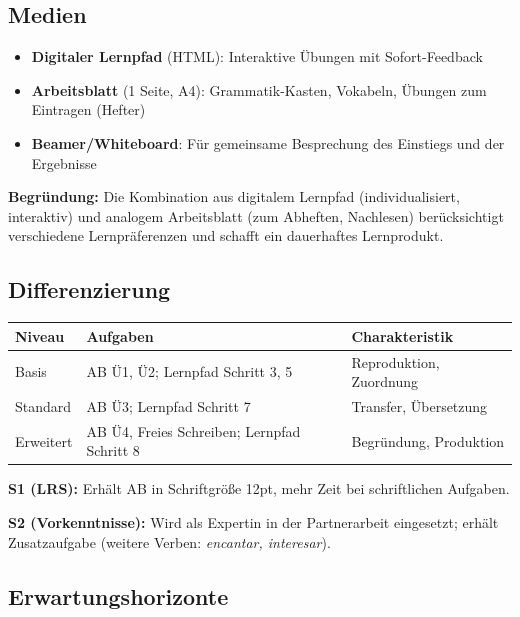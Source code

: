 \documentclass[11pt, a4paper]{article}
\newcommand{\es}[1]{\textcolor{spanisch}{\textit{#1}}}
\begin{document}
\subsection{Medien}

\begin{itemize}[leftmargin=2em]
    \item \textbf{Digitaler Lernpfad} (HTML): Interaktive Übungen mit Sofort-Feedback
    \item \textbf{Arbeitsblatt} (1 Seite, A4): Grammatik-Kasten, Vokabeln, Übungen zum Eintragen (Hefter)
    \item \textbf{Beamer/Whiteboard}: Für gemeinsame Besprechung des Einstiegs und der Ergebnisse
\end{itemize}

\textbf{Begründung:} Die Kombination aus digitalem Lernpfad (individualisiert, interaktiv) und analogem Arbeitsblatt (zum Abheften, Nachlesen) berücksichtigt verschiedene Lernpräferenzen und schafft ein dauerhaftes Lernprodukt.

\subsection{Differenzierung}

\begin{center}
\begin{tabular}{|l|l|l|}
    \hline
    \textbf{Niveau} & \textbf{Aufgaben} & \textbf{Charakteristik} \\
    \hline
    Basis & AB Ü1, Ü2; Lernpfad Schritt 3, 5 & Reproduktion, Zuordnung \\
    \hline
    Standard & AB Ü3; Lernpfad Schritt 7 & Transfer, Übersetzung \\
    \hline
    Erweitert & AB Ü4, Freies Schreiben; Lernpfad Schritt 8 & Begründung, Produktion \\
    \hline
\end{tabular}
\end{center}

\textbf{S1 (LRS):} Erhält AB in Schriftgröße 12pt, mehr Zeit bei schriftlichen Aufgaben.

\textbf{S2 (Vorkenntnisse):} Wird als Expertin in der Partnerarbeit eingesetzt; erhält Zusatzaufgabe (weitere Verben: \es{encantar, interesar}).

\subsection{Erwartungshorizonte}
\end{document}
